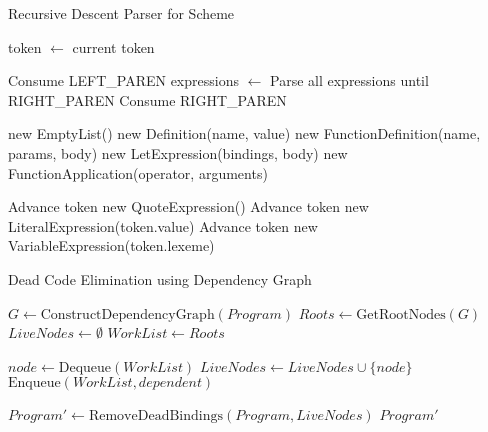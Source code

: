 \documentclass[final]{cmpreport_02}
\begin{document}
\begin{algorithm}
\caption{Recursive Descent Parser for Scheme}
\label{alg:recursive-descent}
\begin{algorithmic}[1]
    \State \Return {}
\EndProcedure

    \State token $\gets$ current token
    
        \State Consume LEFT\_PAREN
        \State expressions $\gets$ Parse all expressions until RIGHT\_PAREN
        \State Consume RIGHT\_PAREN
        
            \State \Return new EmptyList()
                \State \Return new Definition(name, value)
            \Else
                \State \Return new FunctionDefinition(name, params, body)
            \EndIf
            \State \Return new LetExpression(bindings, body)
        \Else
            \State \Return new FunctionApplication(operator, arguments)
        \EndIf
        
        \State Advance token
        \State \Return new QuoteExpression()
        \State Advance token
        \State \Return new LiteralExpression(token.value)
        \State Advance token
        \State \Return new VariableExpression(token.lexeme)
    \EndIf
\EndProcedure
\end{algorithmic}
\end{algorithm}
\begin{algorithm}
\caption{Dead Code Elimination using Dependency Graph}
\label{alg:dce}
\begin{algorithmic}[1]
    \State $G \gets \text{ConstructDependencyGraph}(Program)$
    \State $Roots \gets \text{GetRootNodes}(G)$ 
    \State $LiveNodes \gets \emptyset$
    \State $WorkList \gets Roots$
    
        \State $node \gets \text{Dequeue}(WorkList)$
        \State $LiveNodes \gets LiveNodes \cup \{node\}$
                \State $\text{Enqueue}(WorkList, dependent)$
            \EndIf
        \EndFor
    \EndWhile
    
    \State $Program' \gets \text{RemoveDeadBindings}(Program, LiveNodes)$
    \State \Return $Program'$
\EndProcedure
\end{algorithmic}
\end{algorithm}
\end{document}
